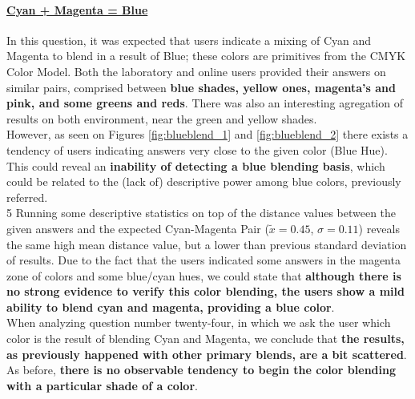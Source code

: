 \paragraph{\ul{Cyan + Magenta = Blue}}
%
In this question, it was expected that users indicate a mixing of Cyan and Magenta to blend in a result of Blue; these colors are primitives from the CMYK Color Model. Both the laboratory and online users provided their answers
on similar pairs, comprised between \textbf{blue shades, yellow ones, magenta's and pink, and some greens and reds}. There was also an interesting agregation of results on both environment, near the green and yellow shades.  \\
%
However, as seen on Figures \ref{fig:blueblend_1} and \ref{fig:blueblend_2} there exists a tendency of users indicating answers very close to the given color (Blue Hue). This could reveal an \textbf{inability of detecting a blue blending
basis}, which could be related to the (lack of) descriptive power among blue colors, previously referred. \\
5
Running some descriptive statistics on top of the distance values between the given answers and the expected Cyan-Magenta Pair ($\tilde{x} = 0.45$, $\sigma = 0.11$) reveals the same high mean distance value, but a lower than previous
standard deviation of results. Due to the fact that the users indicated some answers in the magenta zone of colors and some blue/cyan hues, we could state that \textbf{although there is no strong evidence to verify this color blending, the
users show a mild ability to blend cyan and magenta, providing a blue color}. \\
%
When analyzing question number twenty-four, in which we ask the user which color is the result of blending Cyan and Magenta, we conclude that \textbf{the results, as previously happened with other primary blends, are a bit scattered}.
As before, \textbf{there is no observable tendency to begin the color blending with a particular shade of a color}.
%
